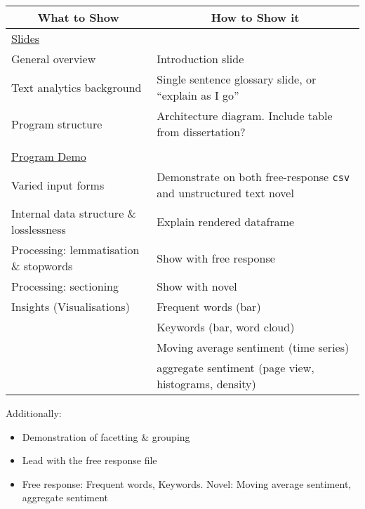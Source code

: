\documentclass[a4paper]{article}
\begin{document}
\begin{landscape}
\begin{table}
  \centering
  \begin{tabular}{ll}
    \toprule
    \multicolumn{1}{c}{What to Show}        & \multicolumn{1}{c}{How to Show it}                                         \\
    \midrule
    \multicolumn{2}{l}{\underline{Slides}}                                                                               \\
    General overview                        & Introduction slide                                                         \\
    Text analytics background               & Single sentence glossary slide, or ``explain as I go''                     \\
    Program structure                       & Architecture diagram. Include table from dissertation?                     \\
                                            &                                                                            \\
    \multicolumn{2}{l}{\underline{Program Demo}}                                                                         \\
    Varied input forms                      & Demonstrate on both free-response \texttt{csv} and unstructured text novel \\
    Internal data structure \& losslessness & Explain rendered dataframe                                                 \\
    Processing: lemmatisation \& stopwords  & Show with free response                                                    \\
    Processing: sectioning                  & Show with novel                                                            \\
    Insights (Visualisations)               & Frequent words (bar)                                                       \\
                                            & Keywords (bar, word cloud)                                                 \\
                                            & Moving average sentiment (time series)                                     \\
                                            & aggregate sentiment (page view, histograms, density)                       \\
                  \bottomrule
  \end{tabular}
\end{table}

Additionally:

\begin{itemize}
\item Demonstration of facetting \& grouping
\item Lead with the free response file
\item Free response: Frequent words, Keywords. Novel: Moving average
  sentiment, aggregate sentiment
\end{itemize}

\end{landscape}
\end{document}
